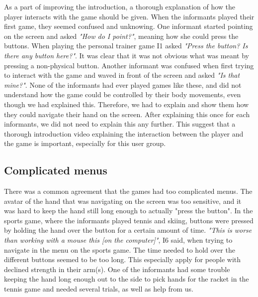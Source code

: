 As a part of improving the introduction, a thorough explanation of how the player interacts with the game should be given. When the informants played their first game, they seemed confused and unknowing. One informant started pointing on the screen and asked \emph{"How do I point?"}, meaning how she could press the buttons. When playing the personal trainer game I1 asked \emph{"Press the button? Is there any button here?"}. It was clear that it was not obvious what was meant by pressing a non-physical button. Another informant was confused when first trying to interact with the game and waved in front of the screen and asked \emph{"Is that mine?"}.  None of the informants had ever played games like these, and did not understand how the game could be controlled by their body movements, even though we had explained this. Therefore, we had to explain and show them how they could navigate their hand on the screen. After explaining this once for each informants, we did not need to explain this any further. This suggest that a thorough introduction video explaining the interaction between the player and the game is important, especially for this user group. 

\subsection{Complicated menus}
There was a common agreement that the games had too complicated menus.  The avatar of the hand that was navigating on the screen was too sensitive, and it was hard to keep the hand still long enough to actually "press the button". In the sports game, where the informants played tennis and skiing, buttons were pressed by holding the hand over the button for a certain amount of time. \emph{"This is worse than working with a mouse this [on the computer]"}, I6 said, when trying to navigate in the menu on the sports game. The time needed to hold over the different buttons seemed to be too long. This especially apply for people with declined strength in their arm(s). One of the informants had some trouble keeping the hand long enough out to the side to pick hands for the racket in the tennis game and needed several trials, as well as help from us.

